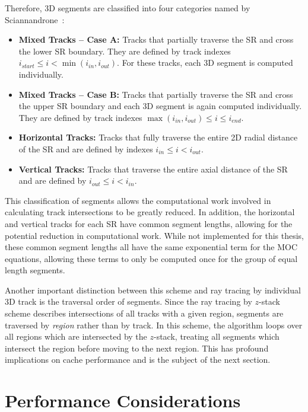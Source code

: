 Therefore, 3D segments are classified into four categories named by Sciannandrone~\cite{Sciannandrone2016}:

\begin{itemize}
	\item \textbf{Mixed Tracks -- Case A:} Tracks that partially traverse the \ac{SR} and cross the lower \ac{SR} boundary. They are defined by track indexes $i_{\textit{start}} \leq i < \min\left(i_{\textit{in}}, i_{\textit{out}}\right)$. For these tracks, each 3D segment is computed individually. 
	\item \textbf{Mixed Tracks -- Case B:} Tracks that partially traverse the \ac{SR} and cross the upper \ac{SR} boundary and each 3D segment is again computed individually. They are defined by track indexes $\max\left(i_{\textit{in}}, i_{\textit{out}}\right)  \leq i  \leq i_{\textit{end}}$.
	\item \textbf{Horizontal Tracks:} Tracks that fully traverse the entire 2D radial distance of the \ac{SR} and are defined by indexes $i_{\textit{in}} \leq i < i_{\textit{out}}$. 
	\item \textbf{Vertical Tracks:} Tracks that traverse the entire axial distance of the \ac{SR} and are defined by $i_{\textit{out}} \leq i < i_{\textit{in}}$.
\end{itemize}

This classification of segments allows the computational work involved in calculating track intersections to be greatly reduced. In addition, the horizontal and vertical tracks for each \ac{SR} have common segment lengths, allowing for the potential reduction in computational work. While not implemented for this thesis, these common segment lengths all have the same exponential term for the \ac{MOC} equations, allowing these terms to only be computed once for the group of equal length segments.

Another important distinction between this scheme and ray tracing by individual 3D track is the traversal order of segments. Since the ray tracing by $z$-stack scheme describes intersections of all tracks with a given region, segments are traversed by \textit{region} rather than by track. In this scheme, the algorithm loops over all regions which are intersected by the $z$-stack, treating all segments which intersect the region before moving to the next region. This has profound implications on cache performance and is the subject of the next section.

\section{Performance Considerations}
\label{sec:performance-considerations}

